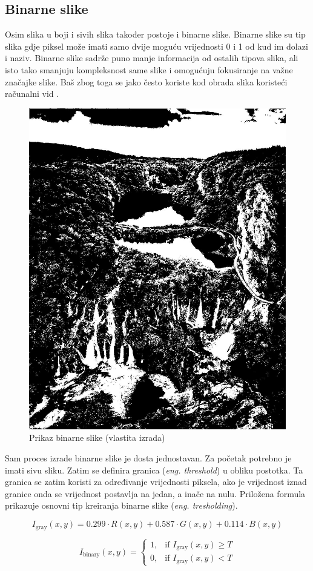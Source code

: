 \documentclass{foi}
\begin{document}
\subsection{Binarne slike}

Osim slika u boji i sivih slika također postoje i binarne slike. Binarne slike su tip slika gdje piksel može imati samo dvije moguću vrijednosti 0 i 1 od kud im dolazi i naziv. Binarne slike sadrže puno manje informacija od ostalih tipova slika, ali isto tako smanjuju kompleksnost same slike i omogućuju fokusiranje na važne značajke slike. Baš zbog toga se jako često koriste kod obrada slika koristeći računalni vid \cite{BinarySlika}.

\begin{figure}[H]
    \centering
    \includegraphics[width=0.75\linewidth]{slike/Binary.jpeg}
    \caption{Prikaz binarne slike (vlastita izrada)}
\end{figure}


Sam proces izrade binarne slike je dosta jednostavan. Za početak potrebno je imati sivu sliku. Zatim se definira granica (\textit{eng. threshold}) u obliku postotka. Ta granica se zatim koristi za određivanje vrijednosti piksela, ako je vrijednost iznad granice onda se vrijednost postavlja na jedan, a inače na nulu. Priložena formula prikazuje osnovni tip kreiranja binarne slike (\textit{eng. tresholding}).

{\large
    \[
I_{\text{gray}}(x, y) = 0.299 \cdot R(x, y) + 0.587 \cdot G(x, y) + 0.114 \cdot B(x, y)
\]

\[
I_{\text{binary}}(x, y) =
\begin{cases}
1, & \text{if } I_{\text{gray}}(x, y) \geq T \\
0, & \text{if } I_{\text{gray}}(x, y) < T
\end{cases}
\]}
\end{document}
